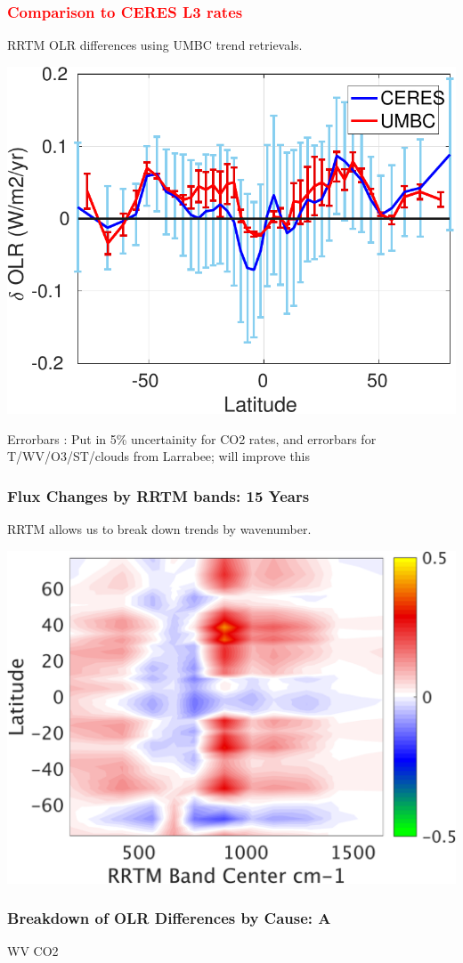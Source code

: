 \documentclass[10pt,t]{beamer}
\begin{document}
\begin{frame}
  \frametitle{\textcolor{red}{\bf Comparison to CERES L3 rates}}
  RRTM OLR differences using UMBC trend retrievals.
  \begin{center}
    \noindent\includegraphics[width=0.7\linewidth]{Figs/umbc_vs_ceres_fluxrates.pdf}
  \end{center}
 Errorbars : Put in 5\% uncertainity for CO2 rates, and errorbars for T/WV/O3/ST/clouds from Larrabee; will improve this
\end{frame}

\begin{frame}
  \frametitle{Flux Changes by RRTM bands: 15 Years}
  RRTM allows us to break down trends by wavenumber.\newline 
  \begin{center}
    \noindent\includegraphics[width=0.625\linewidth]{Figs/umbc_vs_band_fluxrates.png}
  \end{center}
\end{frame}

\begin{frame}
  \frametitle{Breakdown of OLR Differences by Cause: A}

  \hspace{0.50in} WV  \hspace{1.5in} CO2 \\
  \begin{center}
  \end{center}
\end{frame}
\end{document}
